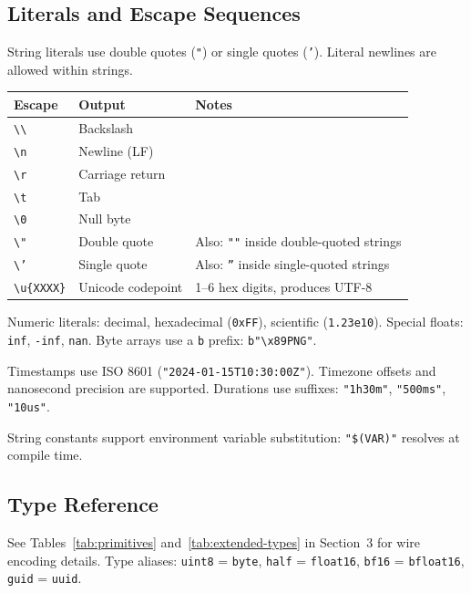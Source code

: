 \documentclass[11pt,onecolumn]{article}
\begin{document}
\subsection{Literals and Escape Sequences}

String literals use double quotes (\texttt{"}) or single quotes (\texttt{'}). Literal newlines are allowed within strings.

\begin{minipage}{\textwidth}
\small
\begin{tabular}{@{}llp{2.5in}@{}}
\toprule
\textbf{Escape} & \textbf{Output} & \textbf{Notes} \\
\midrule
\texttt{\textbackslash\textbackslash} & Backslash & \\
\texttt{\textbackslash n} & Newline (LF) & \\
\texttt{\textbackslash r} & Carriage return & \\
\texttt{\textbackslash t} & Tab & \\
\texttt{\textbackslash 0} & Null byte & \\
\texttt{\textbackslash "} & Double quote & Also: \texttt{""} inside double-quoted strings \\
\texttt{\textbackslash '} & Single quote & Also: \texttt{''} inside single-quoted strings \\
\texttt{\textbackslash u\{XXXX\}} & Unicode codepoint & 1--6 hex digits, produces UTF-8 \\
\bottomrule
\end{tabular}
\end{minipage}

Numeric literals: decimal, hexadecimal (\texttt{0xFF}), scientific (\texttt{1.23e10}). Special floats: \texttt{inf}, \texttt{-inf}, \texttt{nan}. Byte arrays use a \texttt{b} prefix: \texttt{b"\textbackslash x89PNG"}.

Timestamps use ISO 8601 (\texttt{"2024-01-15T10:30:00Z"}). Timezone offsets and nanosecond precision are supported. Durations use suffixes: \texttt{"1h30m"}, \texttt{"500ms"}, \texttt{"10us"}.

String constants support environment variable substitution: \texttt{"\$(VAR)"} resolves at compile time.

\subsection{Type Reference}

See Tables~\ref{tab:primitives} and~\ref{tab:extended-types} in Section~3 for wire encoding details. Type aliases: \texttt{uint8} = \texttt{byte}, \texttt{half} = \texttt{float16}, \texttt{bf16} = \texttt{bfloat16}, \texttt{guid} = \texttt{uuid}.
\end{document}
